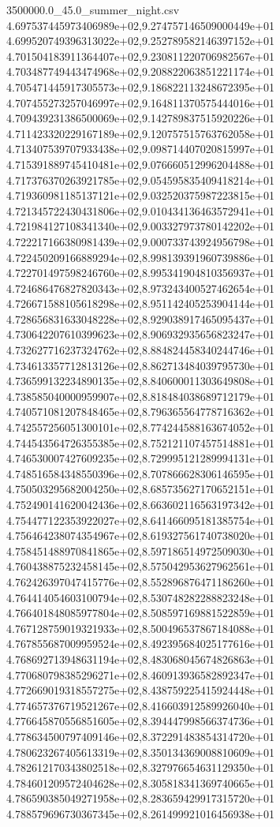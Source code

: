 \begin{filecontents*}{3500000.0_45.0_summer_night.csv}
4.697537445973406989e+02,9.274757146509000449e+01
4.699520749396313022e+02,9.252789582146397152e+01
4.701504183911364407e+02,9.230811220706982567e+01
4.703487749443474968e+02,9.208822063851221174e+01
4.705471445917305573e+02,9.186822113248672395e+01
4.707455273257046997e+02,9.164811370575444016e+01
4.709439231386500069e+02,9.142789837515920226e+01
4.711423320229167189e+02,9.120757515763762058e+01
4.713407539707933438e+02,9.098714407020815997e+01
4.715391889745410481e+02,9.076660512996204488e+01
4.717376370263921785e+02,9.054595835409418214e+01
4.719360981185137121e+02,9.032520375987223815e+01
4.721345722430431806e+02,9.010434136463572941e+01
4.721984127108341340e+02,9.003327973780142202e+01
4.722217166380981439e+02,9.000733743924956798e+01
4.722450209166889294e+02,8.998139391960739886e+01
4.722701497598246760e+02,8.995341904810356937e+01
4.724686476827820343e+02,8.973243400527462654e+01
4.726671588105618298e+02,8.951142405253904144e+01
4.728656831633048228e+02,8.929038917465095437e+01
4.730642207610399623e+02,8.906932935656823247e+01
4.732627716237324762e+02,8.884824458340244746e+01
4.734613357712813126e+02,8.862713484039795730e+01
4.736599132234890135e+02,8.840600011303649808e+01
4.738585040000959907e+02,8.818484038689712179e+01
4.740571081207848465e+02,8.796365564778716362e+01
4.742557256051300101e+02,8.774244588163674052e+01
4.744543564726355385e+02,8.752121107457514881e+01
4.746530007427609235e+02,8.729995121289994131e+01
4.748516584348550396e+02,8.707866628306146595e+01
4.750503295682004250e+02,8.685735627170652151e+01
4.752490141620042436e+02,8.663602116563197342e+01
4.754477122353922027e+02,8.641466095181385754e+01
4.756464238074354967e+02,8.619327561740738020e+01
4.758451488970841865e+02,8.597186514972509030e+01
4.760438875232458145e+02,8.575042953627962561e+01
4.762426397047415776e+02,8.552896876471186260e+01
4.764414054603100794e+02,8.530748282288823248e+01
4.766401848085977804e+02,8.508597169881522859e+01
4.767128759019321933e+02,8.500496537867184088e+01
4.767855687009959524e+02,8.492395684025177616e+01
4.768692713948631194e+02,8.483068045674826863e+01
4.770680798385296271e+02,8.460913936582892347e+01
4.772669019318557275e+02,8.438759225415924448e+01
4.774657376719521267e+02,8.416603912589926040e+01
4.776645870556851605e+02,8.394447998566374736e+01
4.778634500797409146e+02,8.372291483854314720e+01
4.780623267405613319e+02,8.350134369008810609e+01
4.782612170343802518e+02,8.327976654631129350e+01
4.784601209572404628e+02,8.305818341369740665e+01
4.786590385049271958e+02,8.283659429917315720e+01
4.788579696730367345e+02,8.261499921016456938e+01

\end{filecontents*}
